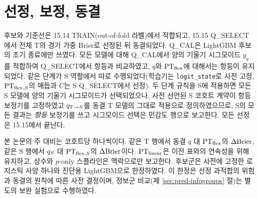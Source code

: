 \section{선정, 보정, 동결}
\label{sec:pred-selection}

후보와 기준선은 15.14 TRAIN(out-of-fold 라벨)에서 적합되고, 15.15 Q\_SELECT에서 전체 T의 경기 가중 Brier로 선정된 뒤 동결되었다. Q\_CAL은 LightGBM 후보의 조기 종료에만 쓰였다. 모든 모델에 대해 Q\_CAL에서 양의 기울기 시그모이드 $g_q$를 적합하여 Q\_SELECT에서 항등과 비교하였고, $q$와 $\mathrm{PT}_{\mathrm{flex}}$에 대해서는 항등이 유지되었다. 같은 단계가 S 역할에서 따로 수행되었다(학습기는 \texttt{logit\_state}로 사전 고정, $\mathrm{PT}_{\mathrm{flex},S}$의 매듭과 $C$는 S Q\_SELECT에서 선정). 두 단계 규칙을 S에 적용하면 모든 S 모델에 양의 기울기 시그모이드가 선택되었으나, 사전 선언된 S 코호트 계약이 항등 보정기를 고정하였고 $q_{T\to S}$를 동결 T 모델의 그대로 적용으로 정의하였으므로, S의 모든 결과는 \emph{항등} 보정기를 쓰고 시그모이드 선택은 민감도 행으로 보고한다. 모든 선정은 15.15에서 끝난다.

본 논문의 주 대비는 코호트당 하나씩이다. 같은 T 행에서 동결 $q$ 대 $\mathrm{PT}_{\mathrm{flex}}$의 $\Delta\mathrm{Brier}$, 같은 S 행에서 $q_{S}$ 대 $\mathrm{PT}_{\mathrm{flex},S}$의 $\Delta\mathrm{Brier}$이다. $\mathrm{PT}_{\mathrm{linear}}$은 이전 표와의 연속성을 위해 유지하고, 상수와 $p$-only 스플라인은 맥락으로만 보고한다. 후보군은 사전에 고정한 로지스틱 사양 하나와 진단용 LightGBM으로 한정하였다. 이 한정은 선정 과적합의 위험과 동결의 원칙에 따른 사전 결정이며, 정보군 비교(제 \ref{sec:pred-infogroups} 절)는 별도의 보완 실험으로 수행하였다.
